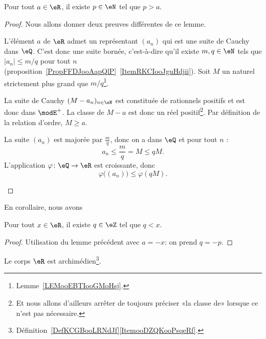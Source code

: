 \begin{lemma}       \label{LemooMWOUooVWgaEi}
    Pour tout \( a\in \eR\), il existe \( p\in \eN\) tel que \( p>a\).
\end{lemma}

\begin{proof}
    Nous allons donner deux preuves différentes de ce lemme.
    \begin{subproof}
    \item[Première façon]

        L'élément \( a\) de \( \eR\) admet un représentant \( (a_n)\) qui est une suite de Cauchy dans \( \eQ\). C'est donc une suite bornée, c'est-à-dire qu'il existe \( m,q\in \eN\) tels que \( | a_n |\leq m/q\) pour tout \( n\) (proposition~\ref{PropFFDJooAapQlP}~\ref{ItemRKCIooJguHdjii}). Soit \( M\) un naturel strictement plus grand que \( m/q\)\footnote{Lemme~\ref{LEMooEBTIooGMoHsj}.}.

    La suite de Cauchy \( (M-a_n)_{n\in \eN}\) est constituée de rationnels positifs et est donc dans \( \modE^+\). La classe de \( M-a\) est donc un réel positif\footnote{Et nous allons d'ailleurs arrêter de toujours préciser «la classe de» lorsque ce n'est pas nécessaire.}. Par définition de la relation d'ordre, \( M\geq a\).
\item[Seconde façon]

    La suite \( (a_n)\) est majorée par \( \frac{ m }{ q }\), donc on a dans \( \eQ\) et pour tout \( n\) :
    \begin{equation}
        a_n\leq \frac{ m }{ q }=M\leq qM.
    \end{equation}
    L'application \( \varphi\colon \eQ\to \eR\) est croissante, donc
    \begin{equation}
        \varphi\big( (a_n) \big)\leq \varphi(qM).
    \end{equation}
    \end{subproof}
\end{proof}

En corollaire, nous avons
\begin{lemma}      \label{LEMooMWOUooVWgbFi}
    Pour tout \( x\in \eR\), il existe \( q\in \eZ\) tel que \( q < x\).
\end{lemma}
\begin{proof}
    Utilisation du lemme précédent avec \( a = -x \): on prend \( q = -p \).
\end{proof}

\begin{theorem}        \label{ThoooKJTTooCaxEny}
    Le corps \( \eR\) est archimédien\footnote{Définition~\ref{DefKCGBooLRNdJf}\ref{ItemooDZQKooPsqeRf}.}.
\end{theorem}

